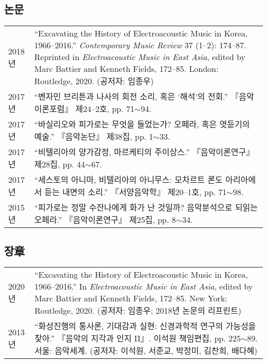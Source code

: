 \documentclass[a4paper,10pt,draft]{article}
\begin{document}
  \subsection*{\small 논문}
  \hspace*{-0.25cm}
  \begin{tabular}{p{3.0cm} p{11cm}}
    2018년 & “Excavating the History of Electroacoustic Music in Korea, 1966–2016.” \textit{Contemporary Music Review} 37 (1–2): 174–87. Reprinted in \textit{Electroacoustic Music in East Asia}, edited by Marc Battier and Kenneth Fields, 172–85. London: Routledge, 2020. (공저자: 임종우)\\[2mm]
    
    2017년 & “벤자민 브리튼과 나사의 회전 소리, 혹은 ‘해석’의 전회.” 『음악이론포럼』 제24--2호, pp. 71$\sim$94.\\[2mm]
    
    2017년 & “바실리오와 피가로는 무엇을 들었는가? 오페라, 혹은 엿듣기의 예술.” 『음악논단』 제38집, pp. 1$\sim$33.\\[2mm]
    
    2017년 & “비텔리아의 양가감정, 마르케티의 주이상스.” 『음악이론연구』 제28집, pp. 44$\sim$67.\\[2mm]
    
    2017년 & “세스토의 아니마, 비텔리아의 아니무스: 모차르트 론도 아리아에서 듣는 내면의 소리.” 『서양음악학』 제20--1호, pp. 71$\sim$98.\\[2mm]
    
    2015년 & “피가로는 정말 수잔나에게 화가 난 것일까? 음악분석으로 되읽는 오페라.” 『음악이론연구』 제25집, pp. 8$\sim$34.
  \end{tabular}
  
  \subsection*{\small 장章}
  \hspace*{-0.25cm}
  \begin{tabular}{p{3.0cm} p{11.0cm}}
    2020년 & “Excavating the History of Electroacoustic Music in Korea,
    1966–2016.” In \textit{Electroacoustic Music in East Asia}, edited by Marc Battier and Kenneth Fields, 172--85. New York: Routledge, 2020. (공저자: 임종우; 2018년 논문의 리프린트)\\[2mm]
    
    2013년 & “화성진행의 통사론, 기대감과 실현: 신경과학적 연구의 가능성을 찾아.” 『음악의 지각과 인지 II』. 이석원 책임편집, pp. 225$\sim$89. 서울: 음악세계. (공저자: 이석원, 서준교, 박정미, 김찬희, 배다혜)
  \end{tabular}
  
\end{document}
